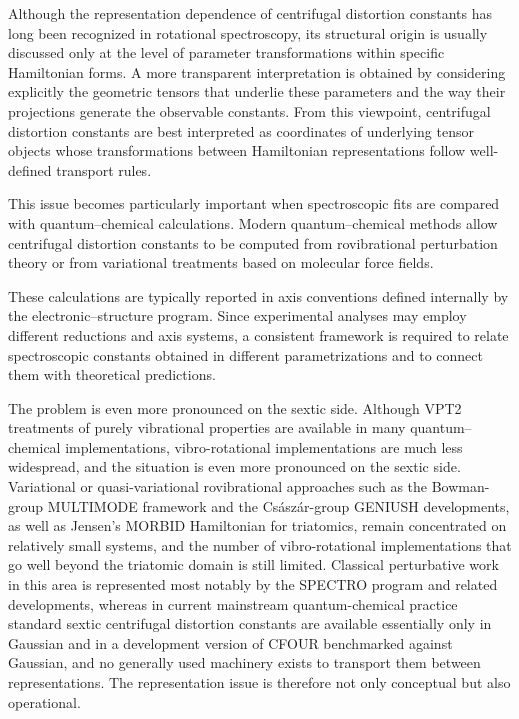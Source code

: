 \documentclass[aip,jcp,reprint,floatfix]{revtex4-2}
\begin{document}
Although the representation dependence of centrifugal distortion
constants has long been recognized in rotational spectroscopy, its
structural origin is usually discussed only at the level of parameter
transformations within specific Hamiltonian forms. A more transparent
interpretation is obtained by considering explicitly the geometric
tensors that underlie these parameters and the way their projections
generate the observable constants. From this viewpoint, centrifugal
distortion constants are best interpreted as coordinates of underlying
tensor objects whose transformations between Hamiltonian
representations follow well-defined transport rules.\cite{Mills1972,AlievWatson1976,PapousekAliev1982,AmatNielsenTarrago1971}

This issue becomes particularly important when spectroscopic fits are
compared with quantum--chemical calculations. Modern quantum--chemical
methods allow centrifugal distortion constants to be computed from
rovibrational perturbation theory\cite{Franke2021} or from variational
treatments based on molecular force fields.\cite{Dinu2022,BowmanCarterHuang2003,MatyusCzakoCsaszar2009,JensenBunker2000,BunkerJensen2005}

These calculations are typically reported in axis conventions defined
internally by the electronic--structure program. Since experimental
analyses may employ different reductions and axis systems, a consistent
framework is required to relate spectroscopic constants obtained in
different parametrizations and to connect them with theoretical
predictions.

The problem is even more pronounced on the sextic side.
Although VPT2 treatments of purely vibrational properties are available
in many quantum--chemical implementations, vibro-rotational
implementations are much less widespread, and the situation is even more
pronounced on the sextic side. Variational or quasi-variational
rovibrational approaches such as the Bowman-group MULTIMODE framework
and the Cs{\'a}sz{\'a}r-group GENIUSH developments, as well as
Jensen's MORBID Hamiltonian for triatomics, remain concentrated on
relatively small systems,\cite{BowmanCarterHuang2003,MatyusCzakoCsaszar2009,Jensen1988MORBID,JensenBunker2000,BunkerJensen2005}
and the number of vibro-rotational implementations that go well beyond
the triatomic domain is still limited. Classical perturbative work in
this area is represented most notably by the SPECTRO program and
related developments,\cite{Gaw1991} whereas in current mainstream
quantum-chemical practice standard sextic centrifugal distortion
constants are available essentially only in Gaussian and in a
development version of CFOUR benchmarked against Gaussian, and no
generally used machinery exists to transport them between
representations.
The representation issue is therefore not only conceptual but also
operational.
\end{document}

